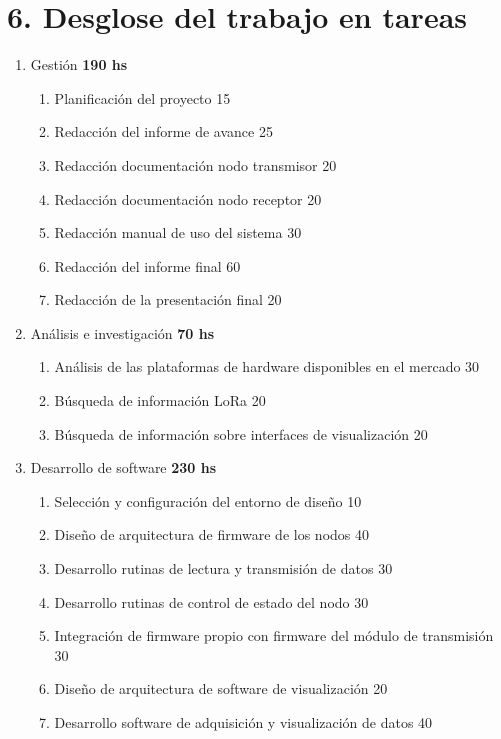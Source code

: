 \documentclass[11pt]{charter}
\begin{document}
\section{6. Desglose del trabajo en tareas}
\label{sec:wbs}
\begin{enumerate}
\item Gestión 																	\hfill \textbf{190 hs}
	\begin{enumerate}
	\item Planificación del proyecto 											\hfill 15
	\item Redacción del informe de avance 										\hfill 25
	\item Redacción documentación nodo transmisor 								\hfill 20
	\item Redacción documentación nodo receptor									\hfill 20
	\item Redacción manual de uso del sistema									\hfill 30
	\item Redacción del informe final 											\hfill 60
	\item Redacción de la presentación final									\hfill 20
	\end{enumerate}
\item Análisis e investigación													\hfill \textbf{70 hs}
	\begin{enumerate}
	\item Análisis de las plataformas de hardware disponibles en el mercado		\hfill 30
	\item Búsqueda de información LoRa											\hfill 20
	\item Búsqueda de información sobre interfaces de visualización				\hfill 20	
	\end{enumerate}
\item Desarrollo de software													\hfill \textbf{230 hs}
	\begin{enumerate}
	\item Selección y configuración del entorno de diseño						\hfill 10
	\item Diseño de arquitectura de firmware de los nodos						\hfill 40
	\item Desarrollo rutinas de lectura y transmisión de datos					\hfill 30
	\item Desarrollo rutinas de control de estado del nodo						\hfill 30
	\item Integración de firmware propio con firmware del módulo de transmisión	\hfill 30
	\item Diseño de arquitectura de software de visualización					\hfill 20
	\item Desarrollo software de adquisición y visualización de datos			\hfill 40

\end{enumerate}
\end{enumerate}
\end{document}
